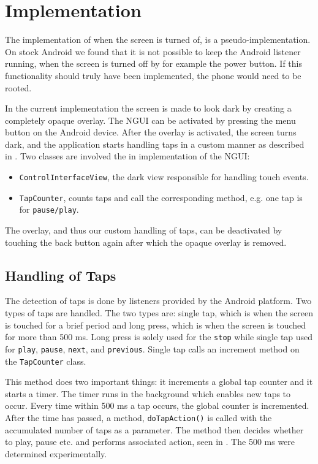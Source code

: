 \section{Implementation}
The implementation of when the screen is turned of, is a pseudo-implementation. On stock Android we found that it is not possible to keep the Android listener running, when the screen is turned off by for example the power button. If this functionality should truly have been implemented, the phone would need to be rooted. 

In the current implementation the screen is made to look dark by creating a completely opaque overlay. The NGUI can be activated by pressing the menu button on the Android device. After the overlay is activated, the screen turns dark, and the application starts handling taps in a custom manner as described in . Two classes are involved the in implementation of the NGUI: 
\begin{itemize}
\item \texttt{ControlInterfaceView}, the dark view responsible for handling touch events.
\item \texttt{TapCounter}, counts taps and call the corresponding method, e.g. one tap is for \texttt{pause/play}.
\end{itemize}


The overlay, and thus our custom handling of taps, can be deactivated by touching the back button again after which the opaque overlay is removed.

\subsection{Handling of Taps}\label{subsec:handleTaps}
The detection of taps is done by listeners provided by the Android platform. Two types of taps are handled. The two types are: single tap, which is when the screen is touched for a brief period and long press, which is when the screen is touched for more than 500 ms. Long press is solely used for the \texttt{stop} while single tap used for \texttt{play}, \texttt{pause}, \texttt{next}, and \texttt{previous}. Single tap calls an increment method on the \texttt{TapCounter} class.

This method does two important things: it increments a global tap counter and it starts a timer. The timer runs in the background which enables new taps to occur. Every time within 500 ms a tap occurs, the global counter is incremented. After the time has passed, a method, \texttt{doTapAction()} is called with the accumulated number of taps as a parameter. The method then decides whether to play, pause etc. and performs associated action, seen in . The 500 ms were determined experimentally.

